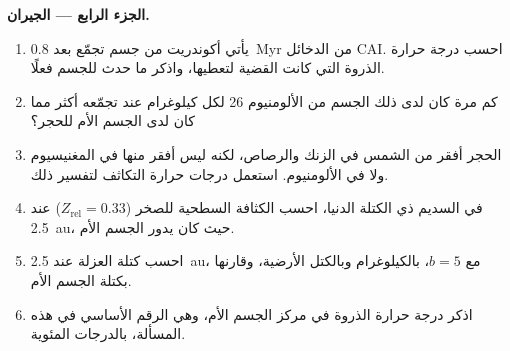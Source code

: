 \begin{problem}
\noindent\textbf{الجزء الرابع --- الجيران.}
\begin{enumerate}[resume]
  \item يأتي أكوندريت من جسم تجمّع بعد \qty{0.8}{Myr} من
        الدخائل CAI. احسب درجة حرارة الذروة التي كانت القضية لتعطيها، واذكر
        ما حدث للجسم فعلًا.
  \item كم مرة كان لدى ذلك الجسم من الألومنيوم 26 لكل كيلوغرام عند
        تجمّعه أكثر مما كان لدى الجسم الأم للحجر؟
  \item الحجر أفقر من الشمس في الزنك والرصاص، لكنه ليس أفقر منها في المغنيسيوم ولا في
        الألومنيوم. استعمل درجات حرارة التكاثف لتفسير ذلك.
  \item في السديم ذي الكتلة الدنيا، احسب الكثافة السطحية للصخر
        ($Z_{\mathrm{rel}} = 0.33$) عند \qty{2.5}{au}، حيث كان يدور الجسم
        الأم.
  \item احسب كتلة العزلة عند \qty{2.5}{au}، مع $b = 5$، بالكيلوغرام
        وبالكتل الأرضية، وقارنها بكتلة الجسم الأم.
  \item اذكر درجة حرارة الذروة في مركز الجسم الأم، وهي الرقم الأساسي
        في هذه المسألة، بالدرجات المئوية.
\end{enumerate}
\end{problem}
